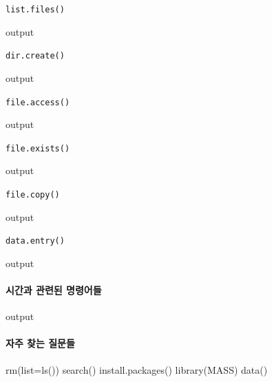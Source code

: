 \documentclass{book}
\begin{document}
\texttt{list.files()}
\begin{Schunk}
\begin{Soutput}
output
\end{Soutput}
\end{Schunk}

\texttt{dir.create()}
\begin{Schunk}
\begin{Soutput}
output
\end{Soutput}
\end{Schunk}

\texttt{file.access()}
\begin{Schunk}
\begin{Soutput}
output
\end{Soutput}
\end{Schunk}

\texttt{file.exists()}
\begin{Schunk}
\begin{Soutput}
output
\end{Soutput}
\end{Schunk}

\texttt{file.copy()}
\begin{Schunk}
\begin{Soutput}
output
\end{Soutput}
\end{Schunk}

\texttt{data.entry()}
\begin{Schunk}
\begin{Soutput}
output
\end{Soutput}
\end{Schunk}

\paragraph{시간과 관련된 명령어들}
\begin{Schunk}
\begin{Soutput}
output
\end{Soutput}
\end{Schunk}

\paragraph{자주 찾는 질문들}
\begin{Schunk}
\begin{Soutput}
rm(list=ls())
search()
install.packages()
library(MASS)
data()

\end{Soutput}
\end{Schunk}
\end{document}

